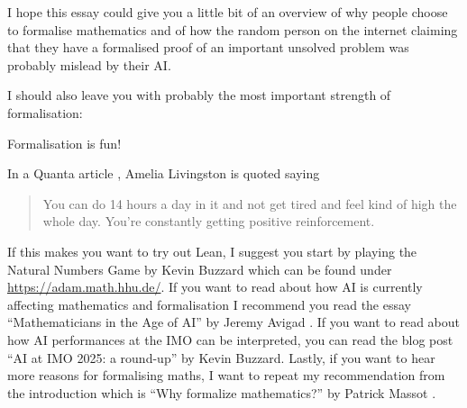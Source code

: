 I hope this essay could give you a little bit of an overview of why people choose to formalise mathematics and of how the random person on the internet claiming that they have a formalised proof of an important unsolved problem was probably mislead by their AI. 

I should also leave you with probably the most important strength of formalisation: 

\begin{strength}
    Formalisation is fun!
\end{strength}

In a Quanta article \cite{Quanta}, Amelia Livingston is quoted saying

\begin{quote}
You can do 14 hours a day in it and not get tired and feel kind of high the whole day. You’re constantly getting positive reinforcement.
\end{quote}

If this makes you want to try out Lean, I suggest you start by playing the Natural Numbers Game by Kevin Buzzard which can be found under \url{https://adam.math.hhu.de/}. If you want to read about how AI is currently affecting mathematics and formalisation I recommend you read the essay ``Mathematicians in the Age of AI'' by Jeremy Avigad \cite{avigad}. If you want to read about how AI performances at the IMO can be interpreted, you can read the blog post ``AI at IMO 2025: a round-up'' by Kevin Buzzard. Lastly, if you want to hear more reasons for formalising maths, I want to repeat my recommendation from the introduction which is ``Why formalize mathematics?'' by Patrick Massot \cite{Massot2021WhyFM}.





